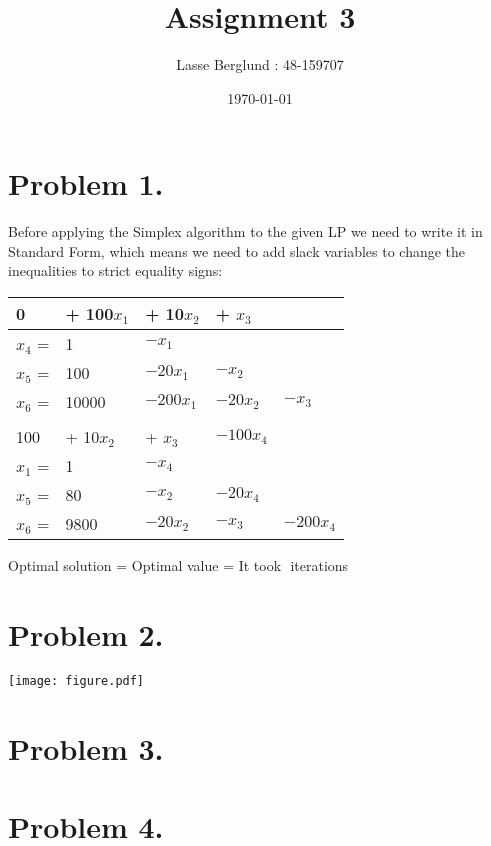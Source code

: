 \documentclass[12pt]{report}
\title{Assignment 3}
\author{Lasse Berglund : 48-159707}
\date{\today}
\begin{document}
\maketitle
\section*{Problem 1.}

Before applying the Simplex algorithm to the given LP we need to write it in Standard Form, which means we need to add slack variables to change the inequalities to strict equality signs:

\begin{tabular}{ l l l l l }
  0 & + 100$x_1$ & + 10$x_2$ & + $x_3$ \\  \hline

  $x_4$ = & 1 & $-x_1$ \\ 
  $x_5$ = & 100 & $-20x_1$ & $- x_2$ \\ 
  $x_6$ = & 10000 & $-200x_1$ & $-20x_2$ & $-x_3$ \\ 

  \\

  100 & + 10$x_2$ & + $x_3$ & $-100x_4$\\  \hline

  $x_1$ = & 1 &  $-x_4$ \\ 
  $x_5$ = & 80  & $- x_2$ & $-20x_4$ \\ 
  $x_6$ = & 9800  & $-20x_2$ & $-x_3$ & $-200x_4$ \\ 


\end{tabular}


Optimal solution = 
Optimal value = 
It took $ $ iterations


\section*{Problem 2.}

\texttt{[image: figure.pdf]}

\section*{Problem 3.}

\section*{Problem 4.}
\end{document}
